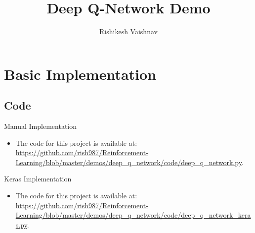 \documentclass[a4paper]{article}
\title{Deep Q-Network Demo}
\author{Rishikesh Vaishnav}
\begin{document}
\maketitle
\section*{Basic Implementation}
\subsection*{Code}
Manual Implementation
\begin{itemize}
    \item The code for this project is available at: 
    \url{https://github.com/rish987/Reinforcement-Learning/blob/master/demos/deep_q_network/code/deep_q_network.py}.
\end{itemize}
Keras Implementation
\begin{itemize}
    \item The code for this project is available at: 
    \url{https://github.com/rish987/Reinforcement-Learning/blob/master/demos/deep_q_network/code/deep_q_network_keras.py}.
\end{itemize}
\end{document}
